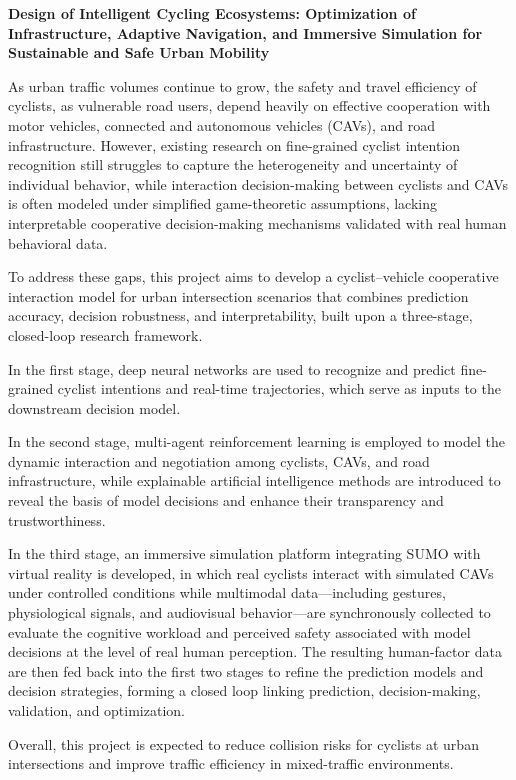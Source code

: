 \documentclass[11pt,a4paper]{article}
\begin{document}
\begin{center}
	{\Large\bfseries Design of Intelligent Cycling Ecosystems: Optimization of Infrastructure, Adaptive Navigation, and Immersive Simulation for Sustainable and Safe Urban Mobility}
\end{center}

\vspace{0.6em}

As urban traffic volumes continue to grow, the safety and travel efficiency of cyclists, as vulnerable road users, depend heavily on effective cooperation with motor vehicles, connected and autonomous vehicles (CAVs), and road infrastructure. However, existing research on fine-grained cyclist intention recognition still struggles to capture the heterogeneity and uncertainty of individual behavior, while interaction decision-making between cyclists and CAVs is often modeled under simplified game-theoretic assumptions, lacking interpretable cooperative decision-making mechanisms validated with real human behavioral data.

To address these gaps, this project aims to develop a cyclist–vehicle cooperative interaction model for urban intersection scenarios that combines prediction accuracy, decision robustness, and interpretability, built upon a three-stage, closed-loop research framework.

In the first stage, deep neural networks are used to recognize and predict fine-grained cyclist intentions and real-time trajectories, which serve as inputs to the downstream decision model.

In the second stage, multi-agent reinforcement learning is employed to model the dynamic interaction and negotiation among cyclists, CAVs, and road infrastructure, while explainable artificial intelligence methods are introduced to reveal the basis of model decisions and enhance their transparency and trustworthiness.

In the third stage, an immersive simulation platform integrating SUMO with virtual reality is developed, in which real cyclists interact with simulated CAVs under controlled conditions while multimodal data—including gestures, physiological signals, and audiovisual behavior—are synchronously collected to evaluate the cognitive workload and perceived safety associated with model decisions at the level of real human perception. The resulting human-factor data are then fed back into the first two stages to refine the prediction models and decision strategies, forming a closed loop linking prediction, decision-making, validation, and optimization.

Overall, this project is expected to reduce collision risks for cyclists at urban intersections and improve traffic efficiency in mixed-traffic environments.
\end{document}

